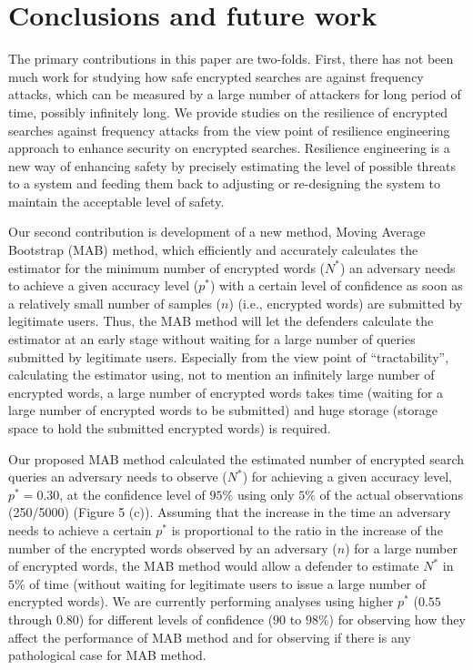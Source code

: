 \documentclass[ ../main.tex]{subfiles}
\begin{document}
\section{Conclusions and future work}
\label{sec:conclusions}
The primary contributions in this paper are two-folds. First, there has
not been much work for studying how safe encrypted searches are against
frequency attacks, which can be measured by a large number of attackers
for long period of time, possibly infinitely long. We provide studies on
the resilience of encrypted searches against frequency attacks from the
view point of resilience engineering approach to enhance security on
encrypted searches. Resilience engineering is a new way of enhancing
safety by precisely estimating the level of possible threats to a system
and feeding them back to adjusting or re-designing the system to
maintain the acceptable level of safety\cite{ref17}.

Our second contribution is development of a new method, Moving Average
Bootstrap (MAB) method, which efficiently and accurately calculates the
estimator for the minimum number of encrypted words ($N^*$) an
adversary needs to achieve a given accuracy level ($p^*$) with a
certain level of confidence as soon as a relatively small number of
samples ($n$) (i.e., encrypted words) are submitted by legitimate
users. Thus, the MAB method will let the defenders calculate the
estimator at an early stage without waiting for a large number of
queries submitted by legitimate users. Especially from the view point of
``tractability'', calculating the estimator using, not to mention an
infinitely large number of encrypted words, a large number of encrypted
words takes time (waiting for a large number of encrypted words to be
submitted) and huge storage (storage space to hold the submitted
encrypted words) is required.

Our proposed MAB method calculated the estimated number of encrypted
search queries an adversary needs to observe ($N^*$) for achieving a
given accuracy level, $p^* = 0.30$, at the confidence level of $95\%$
using only $5\%$ of the actual observations (250/5000) (Figure 5 (c)).
Assuming that the increase in the time an adversary needs to achieve a
certain $p^*$ is proportional to the ratio in the increase of the
number of the encrypted words observed by an adversary ($n$) for a
large number of encrypted words, the MAB method would allow a defender
to estimate $N^*$ in $5\%$ of time (without waiting for legitimate
users to issue a large number of encrypted words). We are currently
performing analyses using higher $p^*$ ($0.55$ through $0.80$) for
different levels of confidence ($90$ to $98\%$) for observing how they
affect the performance of MAB method and for observing if there is any
pathological case for MAB method.
\end{document}
